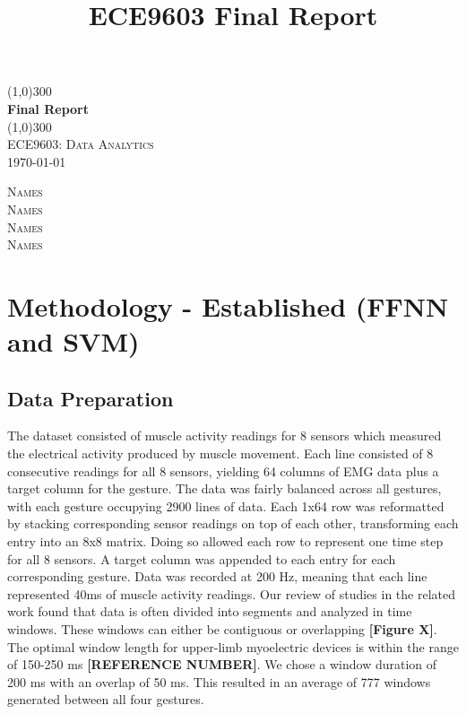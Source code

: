 \documentclass{article}
\title{ECE9603 Final Report}
\begin{document}
\begin{titlepage}
	\begin{center}
    \line(1,0){300}\\
    [0.65cm]
	\huge{\bfseries Final Report}\\
	\line(1,0){300}\\
	\textsc{\Large ECE9603: Data Analytics}\\
	\textsc{\LARGE \today}\\
	[5.5cm]     
	\end{center}
	\begin{center}
		\textsc{\Large Names}\\
		\textsc{\Large Names}\\
		\textsc{\Large Names}\\
		\textsc{\Large Names}\\
		[0.75cm]
	\end{center}
\end{titlepage}

\section*{Methodology - Established (FFNN and SVM)}
\subsection*{Data Preparation}
The dataset consisted of muscle activity readings for 8 sensors which measured the electrical activity produced by muscle movement. Each line consisted of 8 consecutive readings for all 8 sensors, yielding 64 columns of EMG data plus a target column for the gesture. The data was fairly balanced across all gestures, with each gesture occupying 2900 lines of data. Each 1x64 row was reformatted by stacking corresponding sensor readings on top of each other, transforming each entry into an 8x8 matrix. Doing so allowed each row to represent one time step for all 8 sensors. A target column was appended to each entry for each corresponding gesture. Data was recorded at 200 Hz, meaning that each line represented 40ms of muscle activity readings. Our review of studies in the related work found that data is often divided into segments and analyzed in time windows. These windows can either be contiguous or overlapping \textbf{[Figure X]}. The optimal window length for upper-limb myoelectric devices is within the range of 150-250 ms \textbf{[REFERENCE NUMBER]}. We chose a window duration of 200 ms with an overlap of 50 ms. This resulted in an average of 777 windows generated between all four gestures. 
\end{document}
